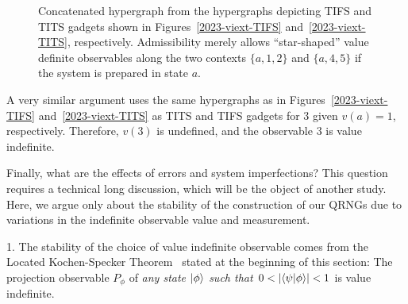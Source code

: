 \documentclass[%
 superscriptaddress,
  preprint,
 showpacs,
 showkeys,
 nofootinbib,
  amsmath,amssymb,
 pra,
  longbibliography,
  floatfix,
 ]{revtex4-2}
\theoremstyle{definition}
\begin{document}
\begin{figure}
                \begin{center}
                \end{center}
                \caption{Concatenated hypergraph from the hypergraphs depicting TIFS and TITS gadgets shown in Figures~\ref{2023-viext-TIFS} and~\ref{2023-viext-TITS},
respectively. Admissibility merely allows ``star-shaped'' value definite observables along the two contexts $\{a,1,2\}$ and $\{a,4,5\}$
if the system is prepared in state $a$.
}
                \label{2023-viext-TIFS&TITSconcatenated}
        \end{figure}

A very similar argument uses the same hypergraphs as in Figures~\ref{2023-viext-TIFS}
and~\ref{2023-viext-TITS} as TITS and TIFS gadgets for $3$ given $v(a)=1$, respectively.
Therefore, $v(3)$ is undefined, and the observable $3$ is value indefinite.


Finally, what are the effects of errors and system imperfections?
This question requires a technical long discussion, which will be the object of another study. Here, we argue only about the stability of the construction of our QRNGs due to variations in the indefinite observable value and measurement.


1. The stability of the choice of value indefinite observable comes from the Located Kochen-Specker Theorem~\cite{2012-incomput-proofsCJ,2015-AnalyticKS} stated at the beginning of this section:
The projection observable $P_\phi$ of {\it any state $\ket{\phi}$ such that {\rm $0<\abs{\bra{\psi}\ket{\phi}}<1$}}
is value
indefinite.
\end{document}
